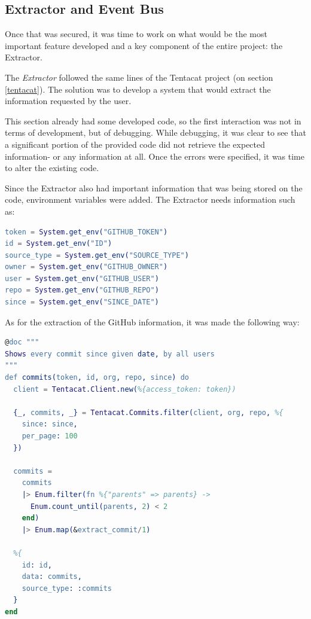 \subsection{Extractor and Event Bus}

Once that was secured, it was time to work on what would be the most important feature developed and a key component of the entire project: the Extractor.\newline

The \textit{Extractor} followed the same lines of the Tentacat project (on section \ref{tentacat}). The solution was to develop a system that would extract the information requested by the user.\newline

This section already had some developed code, so the first interaction was not in terms of development, but of debugging. While debugging, it was clear to see that a significant portion of the provided code did not retrieve the expected information- or any information at all. Once the errors were specified, it was time to alter the existing code.\newline

Since the Extractor also had important information that was being stored on the code, environment variables were added. The Extractor needs information such as: \newline

\begin{lstlisting}[language=erlang, caption={Environment Variables Setup on extractor\_github.ex}]
token = System.get_env("GITHUB_TOKEN")
id = System.get_env("ID")
source_type = System.get_env("SOURCE_TYPE")
owner = System.get_env("GITHUB_OWNER")
user = System.get_env("GITHUB_USER")
repo = System.get_env("GITHUB_REPO")
since = System.get_env("SINCE_DATE")

\end{lstlisting}

As for the extraction of the GitHub information, it was made the following way:\newline

\begin{lstlisting}[language=erlang, caption={Commits extraction of extractor\_github.ex}]
@doc """
Shows every commit since given date, by all users
"""
def commits(token, id, org, repo, since) do
  client = Tentacat.Client.new(%{access_token: token})

  {_, commits, _} = Tentacat.Commits.filter(client, org, repo, %{
    since: since,
    per_page: 100
  })

  commits =
    commits
    |> Enum.filter(fn %{"parents" => parents} ->
      Enum.count_until(parents, 2) < 2
    end)
    |> Enum.map(&extract_commit/1)

  %{
    id: id,
    data: commits,
    source_type: :commits
  }
end
\end{lstlisting}

